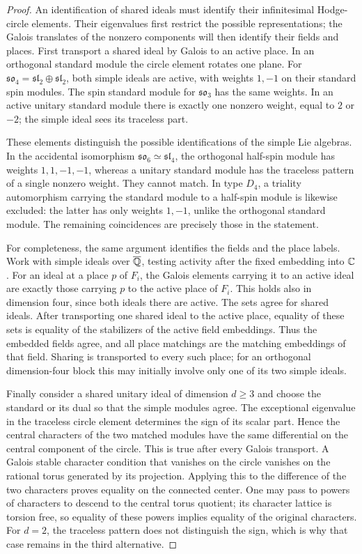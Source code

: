 \begin{proof}
An identification of shared ideals must identify their infinitesimal
Hodge-circle elements.  Their eigenvalues first restrict the
possible representations; the Galois translates of the nonzero
components will then identify their fields and places.
First transport a shared ideal by Galois to an active place.  In an
orthogonal standard module the circle element rotates one plane.  For
$\mathfrak{so}_4=\mathfrak{sl}_2\oplus\mathfrak{sl}_2$, both simple
ideals are active, with weights $1,-1$ on their standard spin modules.
The spin standard module for $\mathfrak{so}_3$ has the same weights.
In an active unitary standard module there is exactly one nonzero
weight, equal to $2$ or $-2$; the simple ideal sees its traceless part.

These elements distinguish the possible identifications of the simple
Lie algebras.  In the accidental isomorphism
$\mathfrak{so}_6\simeq\mathfrak{sl}_4$, the orthogonal half-spin
module has weights $1,1,-1,-1$, whereas a unitary standard module
has the traceless pattern of a single nonzero weight.  They cannot
match.  In type $D_4$, a triality automorphism carrying the standard
module to a half-spin module is likewise excluded: the latter has
only weights $1,-1$, unlike the orthogonal standard module.  The
remaining coincidences are precisely those in the statement.

For completeness, the same argument identifies the fields and the
place labels.  Work with simple ideals over $\overline{\mathbb Q}$, testing
activity after the fixed embedding into $\mathbb C$.  For an ideal at a
place $p$ of $F_i$, the Galois elements carrying it to an active
ideal are exactly those carrying $p$ to the active place of $F_i$.
This holds also in dimension four, since both ideals there are active.
The sets agree for shared ideals.  After transporting one shared ideal
to the active place, equality of these sets is equality of the
stabilizers of the active field embeddings.  Thus the embedded fields
agree, and all place matchings are the matching embeddings of that
field.  Sharing is transported to every such place; for an orthogonal
dimension-four block this may initially involve only one of its two
simple ideals.

Finally consider a shared unitary ideal of dimension $d\ge3$ and
choose the standard or its dual so that the simple modules agree.
The exceptional eigenvalue in the traceless circle element determines
the sign of its scalar part.  Hence the central characters of the two
matched modules have the same differential on the central component
of the circle.  This is true after every Galois transport.  A Galois
stable character condition that vanishes on the circle vanishes on
the rational torus generated by its projection.  Applying this to
the difference of the two characters proves equality on the connected
center.  One may pass to powers of characters to descend to the
central torus quotient; its character lattice is torsion free, so
equality of these powers implies equality of the original characters.
For $d=2$, the traceless pattern does not distinguish the sign, which
is why that case remains in the third alternative.
\end{proof}

